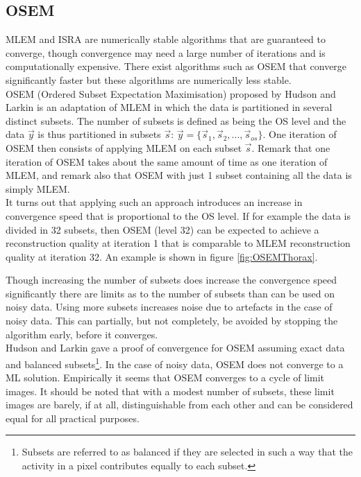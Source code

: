 \documentclass[report,12pt]{report}
\begin{document}
\subsection{OSEM}\label{sec:osem}
MLEM and ISRA are numerically stable algorithms that are guaranteed to converge, though convergence may need a large number of iterations and is computationally expensive. There exist algorithms such as OSEM that converge significantly faster but these algorithms are numerically less stable.\\

OSEM (Ordered Subset Expectation Maximisation) proposed by Hudson and Larkin \cite{OSEM}  is an adaptation of MLEM in which the data is partitioned in several distinct subsets. The number of subsets is defined as being the OS level and the data $\vec{y}$ is thus partitioned in subsets $\vec{s}$: $\vec{y} = \{\vec{s}_1, \vec{s}_2, ..., \vec{s}_{os}\}$. One iteration of OSEM then consists of applying MLEM on each subset $\vec{s}$. Remark that one iteration of OSEM takes about the same amount of time as one iteration of MLEM, and remark also that OSEM with just 1 subset containing all the data is simply MLEM.\\

It turns out that applying such an approach introduces an increase in convergence speed that is proportional to the OS level. If for example the data is divided in 32 subsets, then OSEM (level 32) can be expected to achieve a reconstruction quality at iteration 1 that is comparable to MLEM reconstruction quality at iteration 32. An example is shown in figure \ref{fig:OSEMThorax}. 

Though increasing the number of subsets does increase the convergence speed significantly there are limits as to the number of subsets than can be used on noisy data. Using more subsets increases noise due to artefacts in the case of noisy data. This can partially, but not completely, be avoided by stopping the algorithm early, before it converges.\\

Hudson and Larkin \cite{OSEM} gave a proof of convergence for OSEM assuming exact data and balanced subsets\footnote{Subsets are referred to as balanced if they are selected in such a way that the activity in a pixel contributes equally to each subset.}. In the case of noisy data, OSEM does not converge to a ML solution. Empirically it seems that OSEM converges to a cycle of limit images. It should be noted that with a modest number of subsets, these limit images are barely, if at all, distinguishable from each other and can be considered equal for all practical purposes. 
\end{document}
